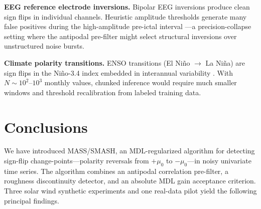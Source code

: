 \documentclass[12pt,letterpaper]{article}
\begin{document}
\textbf{EEG reference electrode inversions.}
Bipolar EEG inversions produce clean sign flips in individual channels.
Heuristic amplitude thresholds generate many false positives during the
high-amplitude pre-ictal interval \citep{Shoeb2004}---a precision-collapse
setting where the antipodal pre-filter might select structural inversions over
unstructured noise bursts.

\textbf{Climate polarity transitions.}
ENSO transitions (El Ni\~no $\to$ La Ni\~na) are sign flips in the Ni\~no-3.4
index embedded in interannual variability \citep{Trenberth1990}.
With $N \sim 10^2$--$10^3$ monthly values, chunked inference would require
much smaller windows and threshold recalibration from labeled training data.

\section{Conclusions}
\label{sec:conclusions}

We have introduced MASS/SMASH, an MDL-regularized algorithm for detecting
sign-flip change-points---polarity reversals from $+\mu_0$ to $-\mu_0$---in
noisy univariate time series.
The algorithm combines an antipodal correlation pre-filter, a roughness
discontinuity detector, and an absolute MDL gain acceptance criterion.
Three solar wind synthetic experiments and one real-data pilot yield the
following principal findings.
\end{document}
